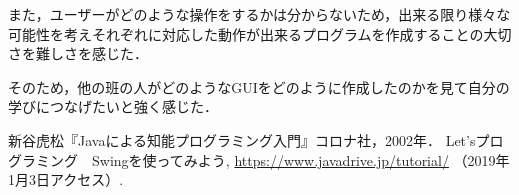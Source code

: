 \documentclass[12pt]{jarticle}
\begin{document}
また，ユーザーがどのような操作をするかは分からないため，出来る限り様々な可能性を考えそれぞれに対応した動作が出来るプログラムを作成することの大切さを難しさを感じた．\par
そのため，他の班の人がどのようなGUIをどのように作成したのかを見て自分の学びにつなげたいと強く感じた．

\begin{thebibliography}{99}
 新谷虎松『Javaによる知能プログラミング入門』コロナ社，2002年．
 Let'sプログラミング　Swingを使ってみよう, \url{https://www.javadrive.jp/tutorial/} （2019年1月3日アクセス）.
\end{thebibliography}
\end{document}
